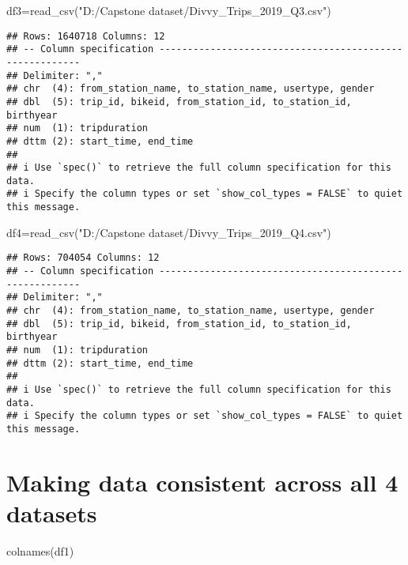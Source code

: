 \documentclass[
]{article}
\newenvironment{Shaded}{\begin{snugshade}}{\end{snugshade}}
\newcommand{\FunctionTok}[1]{\textcolor[rgb]{0.00,0.00,0.00}{#1}}
\newcommand{\NormalTok}[1]{#1}
\newcommand{\OtherTok}[1]{\textcolor[rgb]{0.56,0.35,0.01}{#1}}
\newcommand{\StringTok}[1]{\textcolor[rgb]{0.31,0.60,0.02}{#1}}
\begin{document}
\begin{Shaded}
\begin{Highlighting}[]
\NormalTok{df3}\OtherTok{=}\FunctionTok{read\_csv}\NormalTok{(}\StringTok{"D:/Capstone dataset/Divvy\_Trips\_2019\_Q3.csv"}\NormalTok{)}
\end{Highlighting}
\end{Shaded}

\begin{verbatim}
## Rows: 1640718 Columns: 12
## -- Column specification --------------------------------------------------------
## Delimiter: ","
## chr  (4): from_station_name, to_station_name, usertype, gender
## dbl  (5): trip_id, bikeid, from_station_id, to_station_id, birthyear
## num  (1): tripduration
## dttm (2): start_time, end_time
## 
## i Use `spec()` to retrieve the full column specification for this data.
## i Specify the column types or set `show_col_types = FALSE` to quiet this message.
\end{verbatim}

\begin{Shaded}
\begin{Highlighting}[]
\NormalTok{df4}\OtherTok{=}\FunctionTok{read\_csv}\NormalTok{(}\StringTok{"D:/Capstone dataset/Divvy\_Trips\_2019\_Q4.csv"}\NormalTok{)}
\end{Highlighting}
\end{Shaded}

\begin{verbatim}
## Rows: 704054 Columns: 12
## -- Column specification --------------------------------------------------------
## Delimiter: ","
## chr  (4): from_station_name, to_station_name, usertype, gender
## dbl  (5): trip_id, bikeid, from_station_id, to_station_id, birthyear
## num  (1): tripduration
## dttm (2): start_time, end_time
## 
## i Use `spec()` to retrieve the full column specification for this data.
## i Specify the column types or set `show_col_types = FALSE` to quiet this message.
\end{verbatim}

\hypertarget{making-data-consistent-across-all-4-datasets}{%
\section{Making data consistent across all 4
datasets}\label{making-data-consistent-across-all-4-datasets}}

\begin{Shaded}
\begin{Highlighting}[]
\FunctionTok{colnames}\NormalTok{(df1)}
\end{Highlighting}
\end{Shaded}
\end{document}
